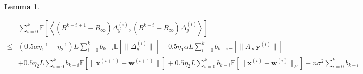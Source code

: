 \documentclass{article}
\newtheorem{lemma}[thm]{Lemma}
\newcommand{\vw}{{\mathbf{w}}}
\newcommand{\vx}{{\mathbf{x}}}
\newcommand{\vy}{{\mathbf{y}}}
\newcommand{\EE}[1]{\mathbb{E}\left[#1\right]}
\newcommand{\norm}[1]{\| #1 \|}
\newcommand{\ip}[1]{\left\langle#1\right\rangle}
\begin{document}
\begin{lemma}\label{lemma: gradient consensus decomposition part 2, before simplyfied}


{ \begin{align*}
  &\sum_{i=0}^k \EE{\ip{(B^{k-i+1}-B_{\infty})\Delta_y^{(i)},(B^{k-i}-B_{\infty})\Delta_g^{(i)}}} \\ 
  \leq& (0.5\alpha\eta_1^{-1}+\eta_2^{-1}) L \sum_{i=0}^k b_{k-i} \EE{\norm{\Delta_y^{(i)}}}+0.5\eta_1\alpha L\sum_{i=0}^k b_{k-i}\EE{\norm{A_{\infty}\vy^{(i)}}}\\&+0.5\eta_2 L\sum_{i=0}^k b_{k-i} \EE{\norm{\vx^{(i+1)}-\vw^{(i+1)}}}+0.5\eta_2 L\sum_{i=0}^k b_{k-i} \EE{\norm{\vx^{(i)}-\vw^{(i)}}_F}+n\sigma^2\sum_{i=0}^k b_{k-i}
\end{align*}}
\end{lemma}
\end{document}

